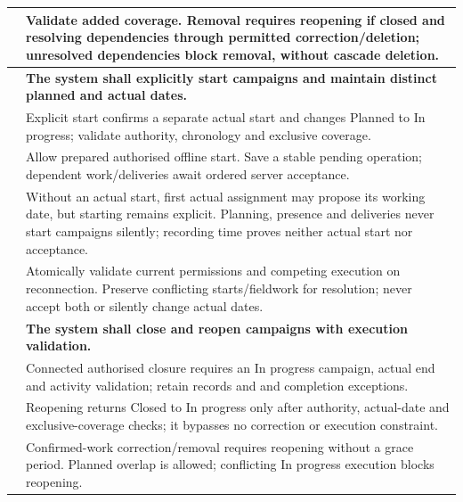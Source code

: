 {\begin{longtable}{L{0.18}L{0.82}}
\label{ac:015:b} & Validate added coverage. Removal requires reopening if closed and resolving dependencies through permitted correction/deletion; unresolved dependencies block removal, without cascade deletion.\\
\midrule
{}
\label{fr:016}\textbf{} & \textbf{The system shall explicitly start campaigns and maintain distinct planned and actual dates.}\\*
\label{ac:016:a} & Explicit start confirms a separate actual start and changes Planned to In progress; validate authority, chronology and exclusive coverage.\\
\label{ac:016:b} & Allow prepared authorised offline start. Save a stable pending operation; dependent work/deliveries await ordered server acceptance.\\
\label{ac:016:c} & Without an actual start, first actual assignment may propose its working date, but starting remains explicit. Planning, presence and deliveries never start campaigns silently; recording time proves neither actual start nor acceptance.\\
\label{ac:016:d} & Atomically validate current permissions and competing execution on reconnection. Preserve conflicting starts/fieldwork for resolution; never accept both or silently change actual dates.\\
\midrule
{}
\label{fr:017}\textbf{} & \textbf{The system shall close and reopen campaigns with execution validation.}\\*
\label{ac:017:a} & Connected authorised closure requires an In progress campaign, actual end and activity validation; retain records and  and  completion exceptions.\\
\label{ac:017:b} & Reopening returns Closed to In progress only after authority, actual-date and exclusive-coverage checks; it bypasses no correction or execution constraint.\\
\label{ac:017:c} & Confirmed-work correction/removal requires reopening without a grace period. Planned overlap is allowed; conflicting In progress execution blocks reopening.\\

\end{longtable}}
